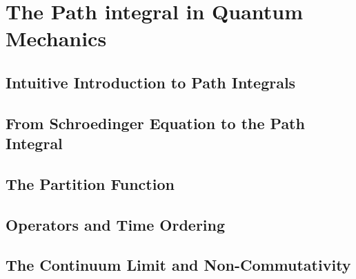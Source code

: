 \documentclass[../main/main.tex]{subfiles}
\begin{document}
\chapter{The Path integral in Quantum Mechanics}

\section{Intuitive Introduction to Path Integrals}
























\section{From Schroedinger Equation to the Path Integral}



\section{The Partition Function}




\section{Operators and Time Ordering}

\section{The Continuum Limit and Non-Commutativity}
\end{document}
